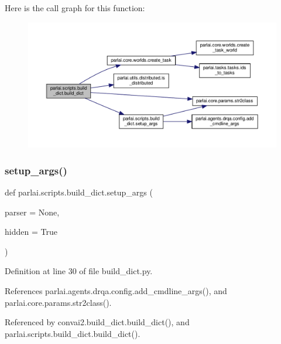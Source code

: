 Here is the call graph for this function\+:
\nopagebreak
\begin{figure}[H]
\begin{center}
\leavevmode
\includegraphics[width=350pt]{namespaceparlai_1_1scripts_1_1build__dict_a3a0381817d7188331ee38b4a4627dbe0_cgraph}
\end{center}
\end{figure}
\mbox{\label{namespaceparlai_1_1scripts_1_1build__dict_a01e78707ace903aa772ada53fafe7067}} 
\subsubsection{\texorpdfstring{setup\+\_\+args()}{setup\_args()}}
{\footnotesize\ttfamily def parlai.\+scripts.\+build\+\_\+dict.\+setup\+\_\+args (\begin{DoxyParamCaption}\item[{}]{parser = {\ttfamily None},  }\item[{}]{hidden = {\ttfamily True} }\end{DoxyParamCaption})}



Definition at line 30 of file build\+\_\+dict.\+py.



References parlai.\+agents.\+drqa.\+config.\+add\+\_\+cmdline\+\_\+args(), and parlai.\+core.\+params.\+str2class().



Referenced by convai2.\+build\+\_\+dict.\+build\+\_\+dict(), and parlai.\+scripts.\+build\+\_\+dict.\+build\+\_\+dict().

